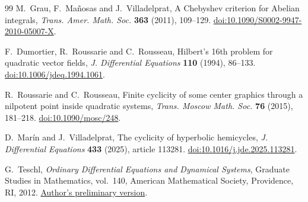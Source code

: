 \begin{thebibliography}{99}
M.~Grau, F.~Ma\~nosas and J.~Villadelprat,
A Chebyshev criterion for Abelian integrals,
\emph{Trans. Amer. Math. Soc.} \textbf{363} (2011), 109--129.
\href{https://doi.org/10.1090/S0002-9947-2010-05007-X}{doi:10.1090/S0002-9947-2010-05007-X}.

F.~Dumortier, R.~Roussarie and C.~Rousseau,
Hilbert's 16th problem for quadratic vector fields,
\emph{J. Differential Equations} \textbf{110} (1994), 86--133.
\href{https://doi.org/10.1006/jdeq.1994.1061}{doi:10.1006/jdeq.1994.1061}.

R.~Roussarie and C.~Rousseau,
Finite cyclicity of some center graphics through a nilpotent point
inside quadratic systems,
\emph{Trans. Moscow Math. Soc.} \textbf{76} (2015), 181--218.
\href{https://doi.org/10.1090/mosc/248}{doi:10.1090/mosc/248}.

D.~Mar\'in and J.~Villadelprat,
The cyclicity of hyperbolic hemicycles,
\emph{J. Differential Equations} \textbf{433} (2025), article 113281.
\href{https://doi.org/10.1016/j.jde.2025.113281}{doi:10.1016/j.jde.2025.113281}.

G.~Teschl,
\emph{Ordinary Differential Equations and Dynamical Systems},
Graduate Studies in Mathematics, vol.~140,
American Mathematical Society, Providence, RI, 2012.
\href{https://www.mat.univie.ac.at/~gerald/ftp/book-ode/ode.pdf}{Author's preliminary version}.
\end{thebibliography}
